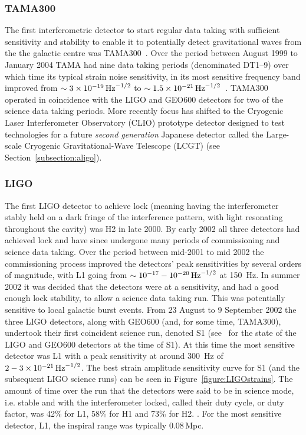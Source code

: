 \documentclass{article}
\begin{document}
\subsubsection{TAMA300}

The first interferometric detector to start regular data taking with sufficient
sensitivity and stability to enable it to potentially detect gravitational waves
from the the galactic centre was TAMA300~\cite{Ando:2001}. Over the period
between August 1999 to January 2004 TAMA had nine data taking periods
(denominated DT1--9) over which time its typical strain noise sensitivity, in
its most sensitive frequency band improved from $\sim3\times10^{-19}\,{\rm
Hz}^{-1/2}$ to $\sim1.5\times10^{-21}\,{\rm Hz}^{-1/2}$~\cite{Akutsu:2006}.
TAMA300 operated in coincidence with the LIGO and GEO600 detectors for two of
the science data taking periods. More recently focus has shifted to the
Cryogenic Laser Interferometer Observatory (CLIO) prototype detector
\cite{Yamamoto:2008, CLIOweb} designed to test technologies for a future {\it
second generation} Japanese detector called the Large-scale Cryogenic
Gravitational-Wave Telescope (LCGT) (see Section~\ref{subsection:aligo}).

\subsubsection{LIGO}
\label{sec:ligoruns}

The first LIGO detector to achieve lock (meaning having the interferometer
stably held on a dark fringe of the interference pattern, with light resonating
throughout the cavity) was H2 in late 2000. By early 2002 all three detectors
had achieved lock and have since undergone many periods of commissioning and
science data taking. Over the period between mid-2001 to mid 2002 the
commissioning process improved the detectors' peak sensitivities by several
orders of magnitude, with L1 going from $\sim10^{-17}-10^{-20}\,{\rm Hz}^{-1/2}$
at 150~Hz. In summer 2002 it was decided that the detectors were at a
sensitivity, and had a good enough lock stability, to allow a science data
taking run. This was potentially sensitive to local galactic burst events. From
23 August to 9 September 2002 the three LIGO detectors, along with GEO600 (and,
for some time, TAMA300), undertook their first coincident science run, denoted
S1 (see~\cite{Abbott:2004a} for the state of the LIGO and GEO600 detectors at
the time of S1). At this time the most sensitive detector was L1 with a peak
sensitivity at around 300~Hz of $2-3\times10^{-21}\,{\rm Hz}^{-1/2}$. The best
strain amplitude sensitivity curve for S1 (and the subsequent LIGO science runs)
can be seen in Figure~\ref{figure:LIGOstrains}. The amount of time over the run
that the detectors were said to be in science mode, i.e. stable and with the
interferometer locked, called their duty cycle, or duty factor, was 42\% for L1,
58\% for H1 and 73\% for H2. . For the most sensitive detector, L1, the inspiral
range was typically 0.08\,Mpc.
\end{document}
